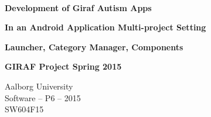 
\begin{center}

	\vspace*{\fill}

	\hrulefill\newline \\

	\begin{huge}	
		\textbf{Development of Giraf Autism Apps}
	\end{huge}

	\vspace{0.6cm}

	\begin{Large}
		\textbf{In an Android Application Multi-project Setting}
	\end{Large}

	\vspace{0.6cm}

	\begin{large}
		\textbf{Launcher, Category Manager, Components}
	\end{large}

	\vspace{1cm}

	\begin{large} 
		\textbf{GIRAF Project Spring 2015}
	\end{large}

	\hrulefill\newline

	Aalborg University		\\
	Software -- P6 -- 2015	\\
	SW604F15				\\
    
	\vspace*{\fill}

\end{center}
\thispagestyle{empty}
